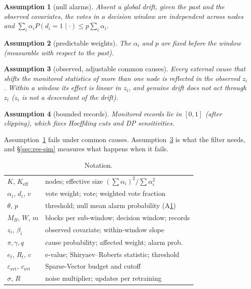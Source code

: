 \IfFileExists{IEEEtran.cls}{\documentclass[journal]{IEEEtran}\newcommand{\ieeemode}{}}{\documentclass[10pt,twocolumn,letterpaper]{article}\usepackage[margin=0.72in,columnsep=0.22in]{geometry}}
\newtheorem{assumption}{Assumption}
\newcommand{\Keff}{K_{\mathrm{eff}}}
\begin{document}
\begin{assumption}[null alarms]\label{as:null}
Absent a global drift, given the past and the observed covariates, the votes in a decision window are independent across nodes and $\sum_i\alpha_iP(d_i=1\mid\cdot)\le p\sum_i\alpha_i$.
\end{assumption}
\begin{assumption}[predictable weights]\label{as:weights} The $\alpha_i$ and $p$ are fixed before the window (measurable with respect to the past).\end{assumption}
\begin{assumption}[observed, adjustable common causes]\label{as:adjust} Every external cause that shifts the monitored statistics of more than one node is reflected in the observed $z_i$. Within a window its effect is linear in $z_i$, and genuine drift does not act through $z_i$ ($z_i$ is not a descendant of the drift).\end{assumption}
\begin{assumption}[bounded records]\label{as:bounded} Monitored records lie in $[0,1]$ (after clipping), which fixes Hoeffding cuts and DP sensitivities.\end{assumption}
\noindent Assumption~\ref{as:null} fails under common causes. Assumption~\ref{as:adjust} is what the filter needs, and \S\ref{sec:res-sim} measures what happens when it fails.

\begin{table}[t]\centering\small
\caption{Notation.}\label{tab:notation}
\begin{tabular}{@{}ll@{}}\toprule
$K$, $\Keff$ & nodes; effective size $(\sum\alpha_i)^2/\sum\alpha_i^2$\\
$\alpha_i$, $d_i$, $v$ & vote weight; vote; weighted vote fraction\\
$\theta$, $p$ & threshold; null mean alarm probability (A\ref{as:null})\\
$M_B$, $W$, $m$ & blocks per sub-window; decision window; records\\
$z_i$, $\beta_i$ & observed covariate; within-window slope\\
$\pi,\gamma,q$ & cause probability; affected weight; alarm prob.\\
$e_t$, $R_t$, $c$ & e-value; Shiryaev--Roberts statistic; threshold\\
$\varepsilon_{\text{svt}}$, $c_{\text{svt}}$ & Sparse-Vector budget and cutoff\\
$\sigma$, $R$ & noise multiplier; updates per retraining\\
\bottomrule\end{tabular}\end{table}
\end{document}
